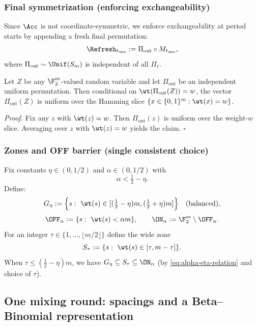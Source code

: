\subsubsection*{Final symmetrization (enforcing exchangeability)}

Since \(\Acc\) is not coordinate-symmetric, we enforce exchangeability at period starts by appending a fresh final permutation:
\begin{equation}
\label{eq:Refresh-def-final}
\Refresh_{t_{\mix}} := \Pi_{\mathrm{out}} \circ M_{t_{\mix}},
\end{equation}
where \(\Pi_{\mathrm{out}}\sim\Unif(S_m)\) is independent of all \(\Pi_\ell\).

\begin{lemma}
\label{lem:exchangeable-by-final-perm}
Let \(Z\) be any \(\F_2^m\)-valued random variable and let \(\Pi_{\mathrm{out}}\) be an independent uniform permutation.
Then conditional on \(\wt(\Pi_{\mathrm{out}}(Z))=w\), the vector \(\Pi_{\mathrm{out}}(Z)\) is uniform over the Hamming slice
\(\{x\in\{0,1\}^m:\wt(x)=w\}\).
\end{lemma}

\noindent
\emph{Proof.}
Fix any \(z\) with \(\wt(z)=w\). Then \(\Pi_{\mathrm{out}}(z)\) is uniform over the weight-\(w\) slice.
Averaging over \(z\) with \(\wt(z)=w\) yields the claim. \(\square\)

\subsubsection*{Zones and OFF barrier (single consistent choice)}

Fix constants \(\eta\in(0,1/2)\) and \(\alpha\in(0,1/2)\) with
\begin{equation}
\label{eq:alpha-eta-relation}
\alpha < \tfrac12-\eta.
\end{equation}
Define:
\[
G_\eta := \Bigl\{s:\ \wt(s)\in[(\tfrac12-\eta)m,(\tfrac12+\eta)m]\Bigr\}
\quad\text{(balanced)},
\]
\[
\OFF_\alpha := \{s:\ \wt(s)<\alpha m\},
\qquad
\ON_\alpha := \F_2^m\setminus \OFF_\alpha.
\]
For an integer \(\tau\in\{1,\dots,\lfloor m/2\rfloor\}\) define the wide zone
\[
S_\tau := \{s:\ \wt(s)\in[\tau,m-\tau]\}.
\]
When \(\tau\le (\tfrac12-\eta)m\), we have \(G_\eta\subseteq S_\tau\subseteq \ON_\alpha\) (by \eqref{eq:alpha-eta-relation} and choice of \(\tau\)).

\subsection{One mixing round: spacings and a Beta--Binomial representation}
\label{sec:one-round-distribution}

